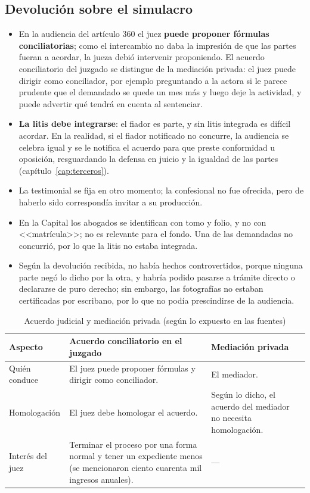\documentclass[12pt,oneside]{book}
\begin{document}
\subsection{Devolución sobre el simulacro}

\begin{itemize}
\item En la audiencia del artículo 360 el juez \textbf{puede proponer fórmulas conciliatorias}; como el intercambio no daba la impresión de que las partes fueran a acordar, la jueza debió intervenir proponiendo. El acuerdo conciliatorio del juzgado se distingue de la mediación privada: el juez puede dirigir como conciliador, por ejemplo preguntando a la actora si le parece prudente que el demandado se quede un mes más y luego deje la actividad, y puede advertir qué tendrá en cuenta al sentenciar.
\item \textbf{La litis debe integrarse}: el fiador es parte, y sin litis integrada es difícil acordar. En la realidad, si el fiador notificado no concurre, la audiencia se celebra igual y se le notifica el acuerdo para que preste conformidad u oposición, resguardando la defensa en juicio y la igualdad de las partes (capítulo~\ref{cap:terceros}).
\item La testimonial se fija en otro momento; la confesional no fue ofrecida, pero de haberlo sido correspondía invitar a su producción.
\item En la Capital los abogados se identifican con tomo y folio, y no con <<matrícula>>; no es relevante para el fondo. Una de las demandadas no concurrió, por lo que la litis no estaba integrada.
\item Según la devolución recibida, no había hechos controvertidos, porque ninguna parte negó lo dicho por la otra, y habría podido pasarse a trámite directo o declararse de puro derecho; sin embargo, las fotografías no estaban certificadas por escribano, por lo que no podía prescindirse de la audiencia.
\end{itemize}

\begin{table}[H]
\centering
\caption{Acuerdo judicial y mediación privada (según lo expuesto en las fuentes)}
\begin{tabularx}{\textwidth}{>{\raggedright\arraybackslash}p{} >{\raggedright\arraybackslash}X >{\raggedright\arraybackslash}X}
\toprule
\textbf{Aspecto} & \textbf{Acuerdo conciliatorio en el juzgado} & \textbf{Mediación privada} \\
\midrule
Quién conduce & El juez puede proponer fórmulas y dirigir como conciliador. & El mediador. \\
Homologación & El juez debe homologar el acuerdo. & Según lo dicho, el acuerdo del mediador no necesita homologación. \\
Interés del juez & Terminar el proceso por una forma normal y tener un expediente menos (se mencionaron ciento cuarenta mil ingresos anuales). & --- \\
\bottomrule
\end{tabularx}
\end{table}
\end{document}
